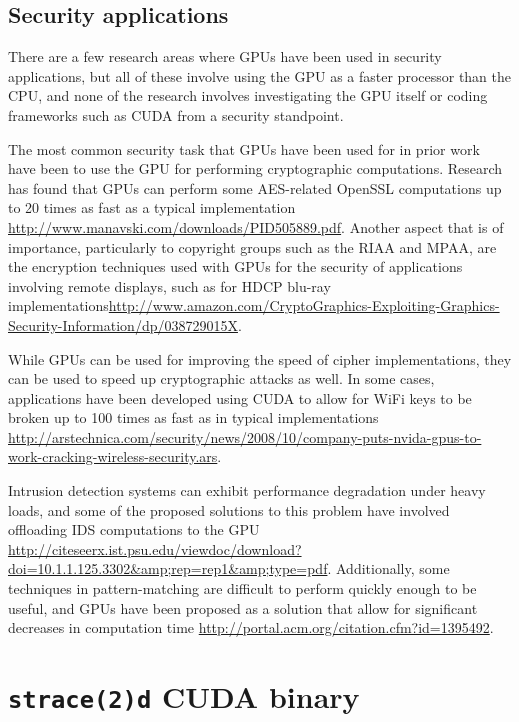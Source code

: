 \documentclass[letterpaper,10pt]{article}
\begin{document}
\begin{multicols}{2}
\subsection{Security applications}
  There are a few research areas where GPUs have been used in security applications, but all of these involve using the GPU as a faster processor than the CPU, and none of the research involves investigating the GPU itself or coding frameworks such as CUDA from a security standpoint.
  
  The most common security task that GPUs have been used for in prior work have been to use the GPU for performing cryptographic computations. Research has found that GPUs can perform some AES-related OpenSSL computations up to 20 times as fast as a typical implementation
\url{http://www.manavski.com/downloads/PID505889.pdf}. Another aspect that is of importance, particularly to copyright groups such as the RIAA and MPAA, are the encryption techniques used with GPUs for the security of applications involving remote displays, such as for HDCP blu-ray implementations\url{http://www.amazon.com/CryptoGraphics-Exploiting-Graphics-Security-Information/dp/038729015X}.
  
  While GPUs can be used for improving the speed of cipher implementations, they can be used to speed up cryptographic attacks as well. In some cases, applications have been developed using CUDA to allow for WiFi keys to be broken up to 100 times as fast as in typical implementations \url{http://arstechnica.com/security/news/2008/10/company-puts-nvida-gpus-to-work-cracking-wireless-security.ars}.
  
  Intrusion detection systems can exhibit performance degradation under heavy
  loads, and some of the proposed solutions to this problem have involved
  offloading IDS computations to the GPU
  \url{http://citeseerx.ist.psu.edu/viewdoc/download?doi=10.1.1.125.3302&amp;rep=rep1&amp;type=pdf}.
  Additionally, some techniques in pattern-matching are difficult to perform
  quickly enough to be useful, and GPUs have been proposed as a solution that
  allow for significant decreases in computation time
  \url{http://portal.acm.org/citation.cfm?id=1395492}.



\end{multicols}
\appendix
\newpage
\section{\texttt{strace(2)d} CUDA binary}\label{strace}
\end{document}
